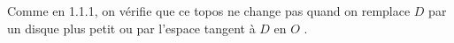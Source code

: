 \begin{center}
\end{center}
Comme en 1.1.1, on vérifie que ce topos ne change pas quand on remplace $D$ par un disque plus petit ou par l'espace tangent à $D$ en $O$ .



